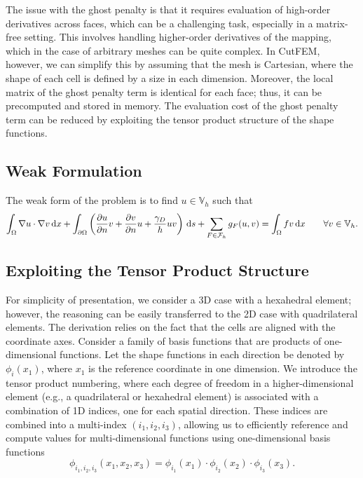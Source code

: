 \documentclass[11pt,a4paper]{article}
\begin{document}
The issue with the ghost penalty is that it requires evaluation of high-order derivatives across faces, which can be a
challenging task, especially in a matrix-free setting. This involves handling higher-order derivatives of the mapping,
which in the case of arbitrary meshes can be quite complex. In CutFEM, however, we can simplify this by assuming that
the mesh is Cartesian, where the shape of each cell is defined by a size in each dimension. Moreover, the local matrix
of the ghost penalty term is identical for each face; thus, it can be precomputed and stored in memory. The evaluation
cost of the ghost penalty term can be reduced by exploiting the tensor product structure of the shape functions.

\subsection{Weak Formulation}
The weak form of the problem is to find $u\in \mathbb{V}_h$ such that
\begin{equation}
    \int_{\Omega} \nabla u \cdot \nabla v \,\mathrm{d}x + \int_{\partial\Omega} \left( \frac{\partial u}{\partial n} v +
    \frac{\partial v}{\partial n} u + \frac{\gamma_D}{h} u v \right) \,\mathrm{d}s + \sum_{F \in
        \mathcal{F}_h} g_F(u,v)= \int_{\Omega} f v
    \,\mathrm{d}x \quad\quad \forall v \in
    \mathbb{V}_h.
\end{equation}

\subsection{Exploiting the Tensor Product Structure}
\label{sec:tensor_product}
For simplicity of presentation, we consider a 3D case with a hexahedral element; however, the reasoning can be easily
transferred to the 2D case with quadrilateral elements. The derivation relies on the fact that the cells are
aligned with the coordinate axes. Consider a family of basis functions that are products of
one-dimensional functions. Let the shape functions in
each direction be denoted by \( \phi_i(x_1) \), where \( x_1 \) is the
reference coordinate in one dimension.
We introduce the tensor product numbering, where each degree of freedom in a higher-dimensional element (e.g., a
quadrilateral or hexahedral element) is associated with a combination of 1D indices, one for each spatial direction.
These indices are combined into a multi-index $(i_1, i_2,     i_3)$,
allowing us to efficiently reference and compute values for multi-dimensional functions using one-dimensional basis
functions
\begin{equation}
    \phi_{i_1, i_2, i_3}( x_1, x_2, x_3 ) = \phi_{i_1}(x_{1}) \cdot \phi_{i_2}(x_{2}) \cdot \phi_{i_3}(x_{3}).
    \label{eq:tensor_product}
\end{equation}
\end{document}
